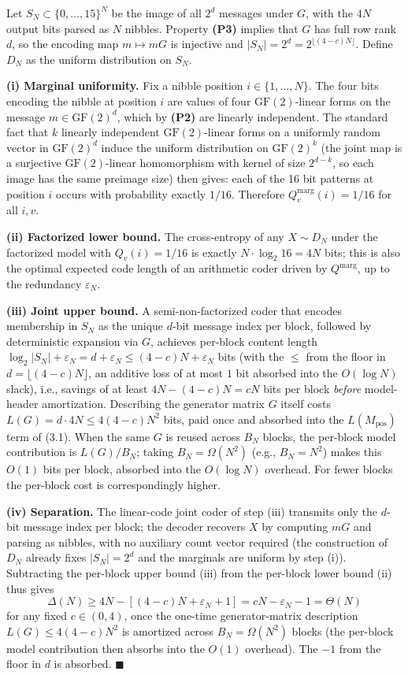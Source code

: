 \documentclass[
]{article}
\begin{document}
Let $S_N \subset \{0, \ldots, 15\}^N$ be the image of all $2^d$
messages under $G$, with the $4N$ output bits parsed as $N$ nibbles.
Property \textbf{(P3)} implies that $G$ has full row rank $d$, so the
encoding map $m \mapsto mG$ is injective and
$|S_N| = 2^d = 2^{\lfloor (4-c)N \rfloor}$. Define $D_N$ as the uniform distribution
on $S_N$.

\textbf{(i) Marginal uniformity.} Fix a nibble position
$i \in \{1, \ldots, N\}$. The four bits encoding the nibble at
position $i$ are values of four $\mathrm{GF}(2)$-linear forms on the
message $m \in \mathrm{GF}(2)^d$, which by \textbf{(P2)} are linearly
independent. The standard fact that $k$ linearly independent
$\mathrm{GF}(2)$-linear forms on a uniformly random vector in
$\mathrm{GF}(2)^d$ induce the uniform distribution on
$\mathrm{GF}(2)^k$ (the joint map is a surjective
$\mathrm{GF}(2)$-linear homomorphism with kernel of size $2^{d - k}$,
so each image has the same preimage size) then gives: each of the
16 bit patterns at position $i$ occurs with probability exactly
$1/16$. Therefore $Q^{\text{marg}}_v(i) = 1/16$ for all $i, v$.

\textbf{(ii) Factorized lower bound.} The cross-entropy of any
$X \sim D_N$ under the factorized model with $Q_v(i) = 1/16$ is
exactly $N \cdot \log_2 16 = 4N$ bits; this is also the optimal
expected code length of an arithmetic coder driven by
$Q^{\text{marg}}$, up to the redundancy $\varepsilon_N$.

\textbf{(iii) Joint upper bound.} A semi-non-factorized coder that
encodes membership in $S_N$ as the unique $d$-bit message index per
block, followed by deterministic expansion via $G$, achieves per-block
content length
$\log_2 |S_N| + \varepsilon_N = d + \varepsilon_N \leq (4 - c)N +
\varepsilon_N$ bits (with the $\leq$ from the floor in
$d = \lfloor (4-c)N \rfloor$, an additive loss of at most $1$ bit
absorbed into the $O(\log N)$ slack), i.e., savings of at least
$4N - (4-c)N = cN$ bits per block \emph{before} model-header
amortization. Describing the generator matrix $G$ itself costs
$L(G) = d \cdot 4N \leq 4(4-c)N^2$ bits, paid once and absorbed
into the $L(M_{\text{pos}})$ term of (3.1). When the same $G$ is
reused across $B_N$ blocks, the per-block model contribution is
$L(G)/B_N$; taking $B_N = \Omega(N^2)$ (e.g., $B_N = N^2$) makes
this $O(1)$ bits per block, absorbed into the $O(\log N)$ overhead.
For fewer blocks the per-block cost is correspondingly higher.

\textbf{(iv) Separation.} The linear-code joint coder of step (iii)
transmits only the $d$-bit message index per block; the decoder
recovers $X$ by computing $m G$ and parsing as nibbles, with no
auxiliary count vector required (the construction of $D_N$ already
fixes $|S_N| = 2^d$ and the marginals are uniform by step (i)).
Subtracting the per-block upper bound (iii) from the per-block lower
bound (ii) thus gives
\[
\Delta(N) \geq 4N - \left[(4 - c)N + \varepsilon_N + 1\right] = cN - \varepsilon_N - 1 = \Theta(N)
\]
for any fixed $c \in (0, 4)$, once the one-time generator-matrix
description $L(G) \leq 4(4-c)N^2$ is amortized across $B_N = \Omega(N^2)$
blocks (the per-block model contribution then absorbs into the
$O(1)$ overhead). The $-1$ from the floor in $d$ is absorbed.
\hfill$\blacksquare$
\end{document}
